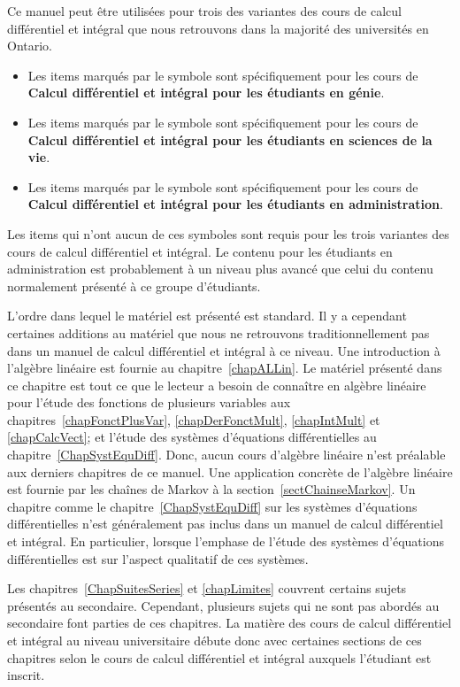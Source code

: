 Ce manuel peut être utilisées pour trois des variantes des cours de
calcul différentiel et intégral que nous retrouvons dans la majorité des
universités en Ontario.

{\renewcommand{\labelitemi}{\textbullet}
\begin{itemize}
\item Les items marqués par le symbole \eng sont spécifiquement pour
les cours de {\bfseries Calcul différentiel et intégral pour les 
étudiants en génie}.
\item Les items marqués par le symbole \life sont spécifiquement pour
les cours de {\bfseries Calcul différentiel et intégral pour les
étudiants en sciences de la vie}.
\item Les items marqués par le symbole \eco sont spécifiquement pour
les cours de {\bfseries Calcul différentiel et intégral pour les
étudiants en administration}.
\end{itemize}
}

Les items qui n'ont aucun de ces symboles sont requis pour les trois
variantes des cours de calcul différentiel et intégral.  Le contenu
pour les étudiants en administration est probablement à un niveau plus
avancé que celui du contenu normalement présenté à ce groupe d'étudiants.

L'ordre dans lequel le matériel est présenté est standard.  Il y a
cependant certaines additions au matériel que nous ne retrouvons
traditionnellement pas dans un manuel de calcul différentiel et
intégral à ce niveau.  Une introduction à l'algèbre linéaire est
fournie au chapitre~\ref{chapALLin}.  Le matériel présenté dans ce
chapitre est tout ce que le lecteur a besoin de connaître en algèbre
linéaire pour l'étude des fonctions de plusieurs variables aux
chapitres~\ref{chapFonctPlusVar}, \ref{chapDerFonctMult}, \ref{chapIntMult}
et \ref{chapCalcVect}; et l'étude des systèmes d'équations
différentielles au chapitre~\ref{ChapSystEquDiff}.   Donc, aucun cours
d'algèbre linéaire n'est préalable aux derniers chapitres de ce
manuel.  Une application concrète de l'algèbre linéaire est fournie
par les chaînes de Markov à la section~\ref{sectChainseMarkov}.
Un chapitre comme le chapitre~\ref{ChapSystEquDiff} sur les
systèmes d'équations différentielles n'est généralement pas inclus
dans un manuel de calcul différentiel et intégral.  En particulier, lorsque
l'emphase de l'étude des systèmes d'équations différentielles est sur
l'aspect qualitatif de ces systèmes.

Les chapitres~\ref{ChapSuitesSeries} et \ref{chapLimites} couvrent
certains sujets présentés au secondaire.  Cependant, plusieurs sujets
qui ne sont pas abordés au secondaire font parties de ces chapitres.
La matière des cours de calcul différentiel et intégral au niveau
universitaire débute donc avec certaines sections de ces chapitres
selon le cours de calcul différentiel et intégral auxquels l'étudiant
est inscrit.

